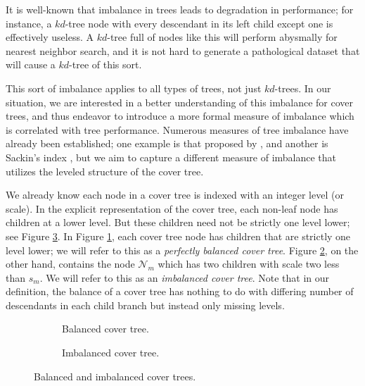 It is well-known that imbalance in trees leads to degradation in performance;
for instance, a $kd$-tree node with every descendant in its left child except
one is effectively useless.  A $kd$-tree full of nodes like this will perform
abysmally for nearest neighbor search, and it is not hard to generate a
pathological dataset that will cause a $kd$-tree of this sort.

This sort of imbalance applies to all types of trees, not just $kd$-trees.  In
our situation, we are interested in a better understanding of this imbalance for
cover trees, and thus endeavor to introduce a more formal measure of imbalance
which is correlated with tree performance.  Numerous measures of tree
imbalance have already been established; one example is that proposed by
\citet{colless1982review}, and another is Sackin's index \citep{sackin1972good},
but we aim to capture a different measure of imbalance that utilizes the leveled
structure of the cover tree.

We already know each node in a cover tree is indexed with an integer level (or
scale).  In the explicit representation of the cover tree, each non-leaf node
has children at a lower level.  But these children need not be strictly one
level lower; see Figure \ref{fig:imbalance}.  In Figure
\ref{fig:imbalance-good}, each cover tree node has children that are strictly
one level lower; we will refer to this as a {\em perfectly balanced cover tree}.
Figure \ref{fig:imbalance-bad}, on the other hand, contains the node
$\mathscr{N}_m$ which has two children with scale two less than $s_m$.  We will
refer to this as an {\em imbalanced cover tree}.  Note that in our definition,
the balance of a cover tree has nothing to do with differing number of
descendants in each child branch but instead only missing levels.

\begin{figure}
\begin{subfigure}[b]{0.585\textwidth}
  \begin{center}
    
  \end{center}
  \caption{Balanced cover tree.}
  \label{fig:imbalance-good}
\end{subfigure}
\begin{subfigure}[b]{0.415\textwidth}
  \begin{center}
    
  \end{center}
  \caption{Imbalanced cover tree.}
  \label{fig:imbalance-bad}
\end{subfigure}
\caption{Balanced and imbalanced cover trees.}
\label{fig:imbalance}
\end{figure}

